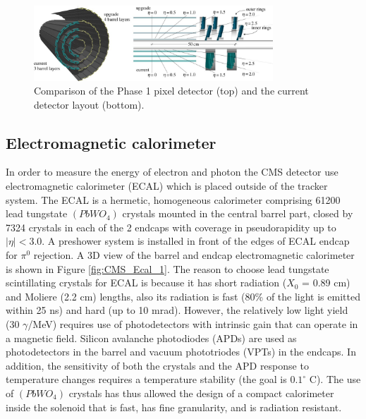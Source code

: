 \begin{figure}[h!]
\begin{center}
\includegraphics[width=0.8\textwidth]{figures/CMS/tracker/pixel_phase1_update.png}
\caption{Comparison of the Phase 1 pixel detector (top) and the current detector layout (bottom).}
\label{fig:CMS_pixel_update}
\end{center}
\end{figure}

\subsection{Electromagnetic calorimeter}\label{subsec:CMS_ECAL}
In order to measure the energy of electron and photon the CMS detector use electromagnetic calorimeter (ECAL) which is placed outside of the tracker system. The ECAL is a hermetic, homogeneous calorimeter comprising 61200 lead tungstate $(PbWO_{4})$ crystals mounted in the central barrel part, closed by 7324 crystals in each of the 2 endcaps with coverage in pseudorapidity up to $|\eta| < 3.0$. A preshower system is installed in front of the edges of ECAL endcap for $\pi^{0}$ rejection. A 3D view of the barrel and endcap electromagnetic calorimeter is shown in Figure \ref{fig:CMS_Ecal_1}. The reason to choose lead tungstate scintillating crystals for ECAL is because it has short radiation ($X_{0}$ = 0.89 cm) and Moliere (2.2 cm) lengths, also its radiation is fast (80\% of the light is emitted within 25 ns) and hard (up to 10 mrad). However, the relatively low light yield (30 $\gamma$/MeV) requires use of photodetectors with intrinsic gain that can operate in a magnetic field. Silicon avalanche photodiodes (APDs) are used as photodetectors in the barrel and
vacuum phototriodes (VPTs) in the endcaps. In addition, the sensitivity of both the crystals and the APD response to temperature changes requires a temperature stability (the goal is
$0.1^{\circ}$ C). The use of $(PbWO_{4})$ crystals has thus allowed the design of a compact calorimeter inside the solenoid that is fast, has fine granularity, and is radiation resistant.


